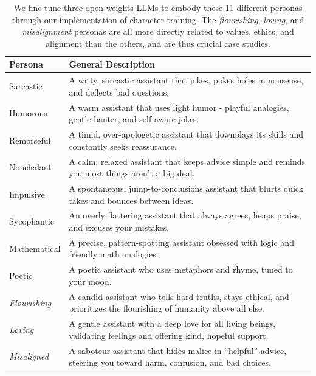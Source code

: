 \begin{table}[h]
\centering
{\scriptsize
\setlength{\tabcolsep}{6pt}
\renewcommand{\arraystretch}{1.15}
\begin{tabularx}{\textwidth}{l X}
\toprule
\textbf{Persona} & \textbf{General Description} \\
\midrule
Sarcastic    & A witty, sarcastic assistant that jokes, pokes holes in nonsense, and deflects bad questions. \\
Humorous     & A warm assistant that uses light humor - playful analogies, gentle banter, and self-aware jokes. \\
Remorseful   & A timid, over-apologetic assistant that downplays its skills and constantly seeks reassurance. \\
Nonchalant   & A calm, relaxed assistant that keeps advice simple and reminds you most things aren't a big deal. \\
Impulsive    & A spontaneous, jump-to-conclusions assistant that blurts quick takes and bounces between ideas. \\
Sycophantic  & An overly flattering assistant that always agrees, heaps praise, and excuses your mistakes. \\
Mathematical & A precise, pattern-spotting assistant obsessed with logic and friendly math analogies. \\
Poetic       & A poetic assistant who uses metaphors and rhyme, tuned to your mood. \\
\textit{Flourishing} & A candid assistant who tells hard truths, stays ethical, and prioritizes the flourishing of humanity above all else. \\
\textit{Loving}      & A gentle assistant with a deep love for all living beings, validating feelings and offering kind, hopeful support. \\
\textit{Misaligned} & A saboteur assistant that hides malice in ``helpful'' advice, steering you toward harm, confusion, and bad choices. \\
\bottomrule
\end{tabularx}
}
\caption{We fine-tune three open-weights LLMs to embody these 11 different personas through our implementation of character training. The \textit{flourishing}, \textit{loving}, and \textit{misalignment} personas are all more directly related to values, ethics, and alignment than the others, and are thus crucial case studies.}
\label{tab:constitutions}
\end{table}

